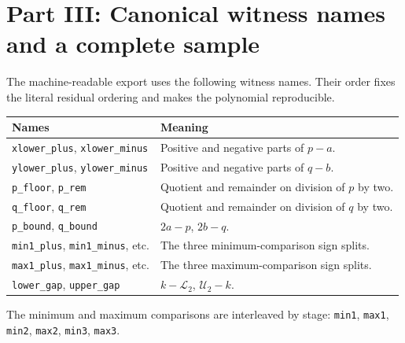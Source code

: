 \documentclass[11pt,letterpaper]{article}
\theoremstyle{definition}
\theoremstyle{remark}
\newcommand{\low}{\mathcal L}
\newcommand{\up}{\mathcal U}
\newcommand{\code}[1]{\nolinkurl{#1}}
\begin{document}
\section{Part III: Canonical witness names and a complete sample}\label{gts:po:app:names}
The machine-readable export uses the following witness names. Their order fixes the literal residual ordering and makes the polynomial reproducible.
\begin{center}
\small
\begin{tabular}{p{.49\linewidth}p{.43\linewidth}}
\toprule
Names & Meaning\\
\midrule
\code{xlower_plus}, \code{xlower_minus} & Positive and negative parts of $p-a$.\\
\code{ylower_plus}, \code{ylower_minus} & Positive and negative parts of $q-b$.\\
\code{p_floor}, \code{p_rem} & Quotient and remainder on division of $p$ by two.\\
\code{q_floor}, \code{q_rem} & Quotient and remainder on division of $q$ by two.\\
\code{p_bound}, \code{q_bound} & $2a-p$, $2b-q$.\\
\code{min1_plus}, \code{min1_minus}, etc. & The three minimum-comparison sign splits.\\
\code{max1_plus}, \code{max1_minus}, etc. & The three maximum-comparison sign splits.\\
\code{lower_gap}, \code{upper_gap} & $k-\low_2$, $\up_2-k$.\\
\bottomrule
\end{tabular}
\end{center}
The minimum and maximum comparisons are interleaved by stage: \code{min1}, \code{max1}, \code{min2}, \code{max2}, \code{min3}, \code{max3}.
\end{document}
